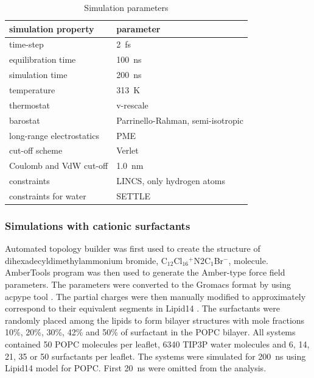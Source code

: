 \documentclass[aip,jcp,twocolumn]{revtex4}
\begin{document}
\begin{table}[btp]
  \caption{Simulation parameters}
  \label{tbl:mdpar}
  \begin{tabular}{ll}
    simulation property & parameter   \\
    \hline
    time-step           & 2~fs         \\
    equilibration time  & 100~ns  \\
    simulation time     & 200~ns  \\
    temperature         & 313~K       \\
    thermostat          & v-rescale  \cite{bussi07}   \\
    barostat            & Parrinello-Rahman, semi-isotropic \cite{parrinello81} \\
    long-range electrostatics & PME  \cite{darden93}  \\
    cut-off scheme      & Verlet \cite{Pall13}      \\
    Coulomb and VdW cut-off & 1.0~nm \\
    constraints         & LINCS, only hydrogen atoms \cite{hess97} \\
    constraints for water & SETTLE  \cite{miyamoto92} \\
    \hline
  \end{tabular}
\end{table}


\subsubsection{Simulations with cationic surfactants}
Automated topology builder \cite{malde11} was first used to create the structure of
dihexadecyldimethylammonium bromide, C$_{12}$Cl$_{16}$$^+$N2C$_1$Br$^-$, molecule.
AmberTools program \cite{amber} was then used to generate the Amber-type force field
parameters. The parameters were converted to the Gromacs format by using
acpype tool \cite{acpype}. The partial charges were then manually modified
to approximately correspond to their equivalent segments in Lipid14 \cite{dickson14}.
The surfactants were randomly placed among the lipids to form bilayer structures with
mole fractions 10\%, 20\%, 30\%, 42\% and 50\% of surfactant in the POPC bilayer.
All systems contained 50 POPC molecules per leaflet, 6340 TIP3P water molecules and
6, 14, 21, 35 or 50 surfactants per leaflet.
The systems were simulated for 200~ns using Lipid14 model for POPC.
First 20~ns were omitted from the analysis. 
\end{document}
